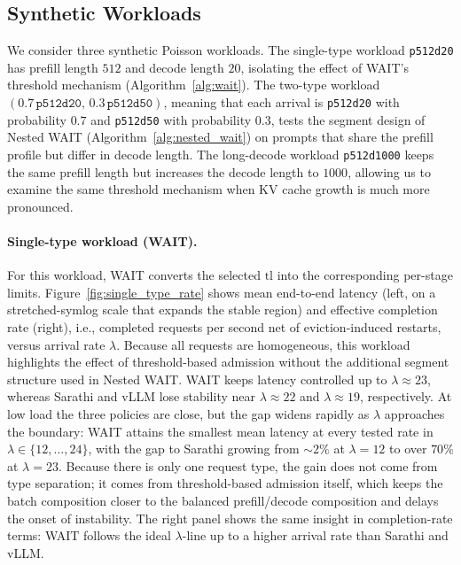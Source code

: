 \subsection{Synthetic Workloads}
\label{sec:exp_synthetic}

We consider three synthetic Poisson workloads. The single-type workload \texttt{p512d20} has prefill length $512$ and decode length $20$, isolating the effect of WAIT's threshold mechanism (Algorithm~\ref{alg:wait}). The two-type workload $(0.7\,\texttt{p512d20},\,0.3\,\texttt{p512d50})$, meaning that each arrival is \texttt{p512d20} with probability $0.7$ and \texttt{p512d50} with probability $0.3$, tests the segment design of Nested WAIT (Algorithm~\ref{alg:nested_wait}) on prompts that share the prefill profile but differ in decode length. The long-decode workload \texttt{p512d1000} keeps the same prefill length but increases the decode length to $1000$, allowing us to examine the same threshold mechanism when KV cache growth is much more pronounced.

\paragraph{Single-type workload (WAIT).}
For this workload, WAIT converts the selected $\mathrm{tl}$ into the corresponding per-stage limits. Figure~\ref{fig:single_type_rate} shows mean end-to-end latency (left, on a stretched-symlog scale that expands the stable region) and effective completion rate (right), i.e., completed requests per second net of eviction-induced restarts, versus arrival rate $\lambda$. Because all requests are homogeneous, this workload highlights the effect of threshold-based admission without the additional segment structure used in Nested WAIT. WAIT keeps latency controlled up to $\lambda \approx 23$, whereas Sarathi and vLLM lose stability near $\lambda \approx 22$ and $\lambda \approx 19$, respectively. At low load the three policies are close, but the gap widens rapidly as $\lambda$ approaches the boundary: WAIT attains the smallest mean latency at every tested rate in $\lambda \in \{12, \dots, 24\}$, with the gap to Sarathi growing from ${\sim}2\%$ at $\lambda = 12$ to over $70\%$ at $\lambda = 23$. Because there is only one request type, the gain does not come from type separation; it comes from threshold-based admission itself, which keeps the batch composition closer to the balanced prefill/decode composition and delays the onset of instability. The right panel shows the same insight in completion-rate terms: WAIT follows the ideal $\lambda$-line up to a higher arrival rate than Sarathi and vLLM.

